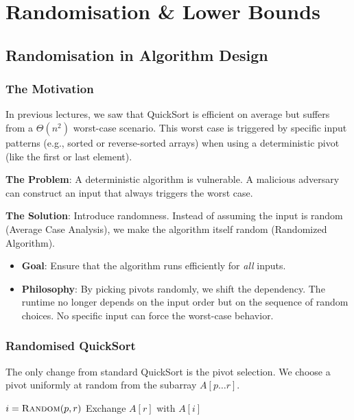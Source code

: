 \documentclass[12pt]{article}
\theoremstyle{blueplain}
\theoremstyle{bluedef}
\theoremstyle{blueremark}
\begin{document}
\section{Randomisation \& Lower Bounds}

\subsection{Randomisation in Algorithm Design}

\subsubsection{The Motivation}
In previous lectures, we saw that QuickSort is efficient on average but suffers from a $\Theta(n^2)$ worst-case scenario. This worst case is triggered by specific input patterns (e.g., sorted or reverse-sorted arrays) when using a deterministic pivot (like the first or last element).

\textbf{The Problem}: A deterministic algorithm is vulnerable. A malicious adversary can construct an input that always triggers the worst case.

\textbf{The Solution}: Introduce randomness. Instead of assuming the input is random (Average Case Analysis), we make the algorithm itself random (Randomized Algorithm).
\begin{itemize}
    \item \textbf{Goal}: Ensure that the algorithm runs efficiently for \textit{all} inputs.
    \item \textbf{Philosophy}: By picking pivots randomly, we shift the dependency. The runtime no longer depends on the input order but on the sequence of random choices. No specific input can force the worst-case behavior.
\end{itemize}

\subsubsection{Randomised QuickSort}
The only change from standard QuickSort is the pivot selection. We choose a pivot uniformly at random from the subarray $A[p \dots r]$.

\begin{algorithm}
    \caption{Randomised Partition}\label{alg:randPartition}
    \begin{algorithmic}[1]
        \State $i = \Call{Random}{p, r}$ 
        \State Exchange $A[r]$ with $A[i]$ 
        \State \Return {} 
        \EndProcedure
    \end{algorithmic}
\end{algorithm}
\end{document}
